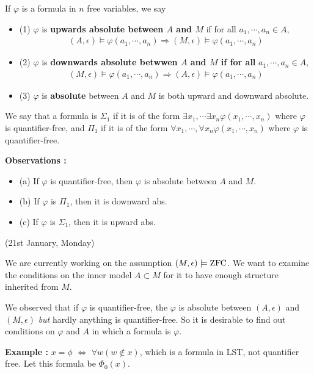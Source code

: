 \documentclass[12pt,a4paper]{article}
\renewenvironment{i}
{\begin{itemize} 
	}%
	{\end{itemize}
}
\begin{document}
 If $\varphi$ is a formula in $n$ free variables, we say
\begin{i}
\item[(1)] $\varphi$ is \textbf{upwards absolute between $A$ and $M$} if for all $a_1, \cdots, a_n \in A$,
\begin{align*}
(A, \epsilon) \models \varphi(a_1, \cdots, a_n) \Rightarrow (M, \epsilon) \models \varphi(a_1, \cdots, a_n)
\end{align*}
\item[(2)] $\varphi$ is \textbf{downwards absolute betwwen $A$ and $M$ if for all} $a_1, \cdots, a_n \in A$,
\begin{align*}
(M, \epsilon) \models \varphi(a_1, \cdots, a_n) \Rightarrow (A, \epsilon) \models \varphi(a_1, \cdots, a_n)
\end{align*}
\item[(3)] $\varphi$ is \textbf{absolute} between $A$ and $M$ is both upward and downward absolute. 
\end{i}
\s

 We say that a formula is $\Sigma_1$ if it is of the form $\exists x_1, \cdots \exists x_n \varphi(x_1, \cdots, x_n)$ where $\varphi$ is quantifier-free, and $\Pi_1$ if it is of the form $\forall x_1, \cdots, \forall x_n \varphi(x_1, \cdots, x_n)$ where $\varphi$ is quantifier-free.
\s

\textbf{Observations :} 
\begin{i}
\item[(a)] If $\varphi$ is quantifier-free, then $\varphi$ is absolute between $A$ and $M$.
\item[(b)] If $\varphi$ is $\Pi_1$, then it is downward abs.
\item[(c)] If $\varphi$ is $\Sigma_1$, then it is upward abs. 
\end{i}
\s

\newday

(21st January, Monday)
\s

We are currently working on the assumption $(M, \epsilon) \models \text{ZFC}$. We want to examine the conditions on the inner model $A\subset M$ for it to have enough structure inherited from $M$.

\quad We observed that if $\varphi$ is quantifier-free, the $\varphi$ is absolute between $(A, \epsilon)$ and $(M, \epsilon)$ \emph{but} hardly anything is quantifier-free. So it is desirable to find out conditions on $\varphi$ and $A$ in which a formula is $\varphi$.
\s

\textbf{Example :} $x =\phi$ $\Leftrightarrow$ $\forall w(w \not\in x)$, which is a formula in LST, not quantifier free. Let this formula be $\Phi_0(x)$.
\end{document}

